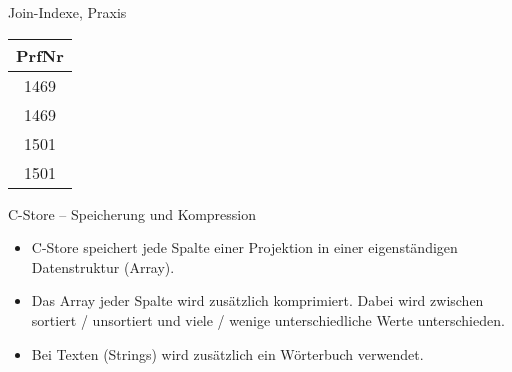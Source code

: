 \begin{frame}{Join-Indexe, Praxis}
\quad
\begin{tabular}{|c|}
	\hline
	PrfNr \\ \hline
	1469  \\ \hline
	1469  \\ \hline
	1501  \\ \hline
	1501  \\ \hline
\end{tabular}

\end{frame}


\begin{frame}{C-Store -- Speicherung und Kompression}

\begin{itemize}
	\item C-Store speichert jede Spalte einer Projektion in einer eigenst\"andigen Datenstruktur (Array).
	\item Das Array jeder Spalte wird zus\"atzlich komprimiert.
	Dabei wird zwischen sortiert / unsortiert und viele / wenige unterschiedliche Werte unterschieden.
	\item Bei Texten (Strings) wird zus\"atzlich ein W\"orterbuch verwendet.
\end{itemize}

\end{frame}

